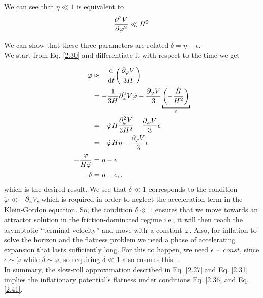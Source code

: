 We can see that \(\eta \ll 1 \) is equivalent to
\begin{align}
    \pdv[2]{V}{\varphi} \ll H^2 \label{2.42}
\end{align}

We can show that these three parameters are related  \(\delta = \eta - \epsilon \).\\
We start from Eq. \ref{2.30} and differentiate it with respect to the time we get 

\begin{align}
    \ddot{\varphi} &\approx - \dv{}{t} \qty( \frac{\partial_{\varphi} V}{3H})  \\ &= - \frac{1}{3H} \partial^{2} _{\varphi} V \dot{\varphi} - \frac{\partial_{\varphi} V}{3} \underbracket{\qty(- \frac{\dot{H}}{H^2})}_{\epsilon }  \\ &= - \dot{\varphi} H \frac{\partial^{2} _{\varphi} V}{3H^2} - \frac{\partial_{\varphi} V}{3} \epsilon  \\ &= - \dot{\varphi} H \eta - \frac{\partial_{\varphi} V}{3} \epsilon  \\ {-\frac{\ddot{\varphi}}{H \ddot{\varphi}}} &= \eta - \epsilon  \\
    \delta &= \eta - \epsilon,.\label{2.48}
\end{align}
which is the desired result.
We see that $\delta \ll 1 $ corresponds to the condition $\ddot{\varphi} \ll -\partial_{\varphi} V$, which is required in order to neglect the acceleration term in the Klein-Gordon equation. So, the condition  $\delta \ll 1 $ ensures that we move towards an attractor solution in the friction-dominated regime i.e., it will then reach the asymptotic “terminal velocity” and move with a constant $\dot{\varphi}$. Also, for inflation to solve the horizon and the flatness problem we need a phase of accelerating expansion that lasts sufficiently long. For this to happen, we need $\epsilon \sim const$, since $\epsilon \sim \dot{\varphi}$ while $\delta \sim \ddot{\varphi}$, so requiring $\delta \ll 1$ also ensures this.
.\\
\hspace{0.5cm}In summary, the slow-roll approximation described in Eq. \ref{2.27} and Eq. \ref{2.31} implies the inflationary potential's flatness under conditions Eq. \ref{2.36} and Eq. \ref{2.41}.\\



